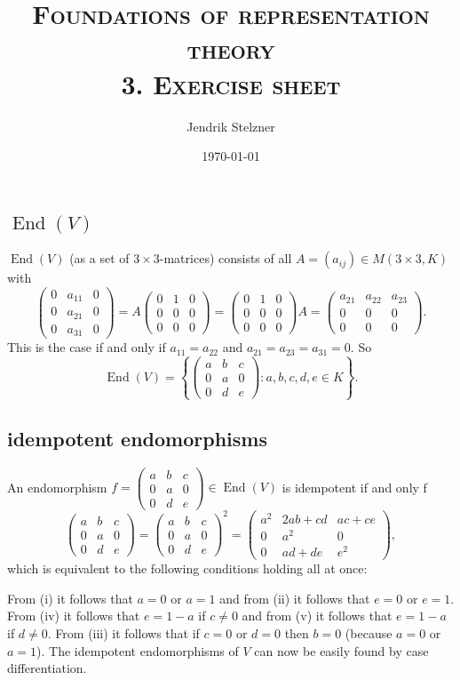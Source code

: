 \documentclass[a4paper,10pt]{article}
\title{\textsc{Foundations of representation theory \\ \Large 3. Exercise sheet}}
\author{Jendrik Stelzner}
\date{\today}
\newcommand{\End}{\operatorname{End}}
\newcommand{\vect}[1]{\begin{pmatrix}#1\end{pmatrix}}
\begin{document}
\maketitle





\section{}


\subsection*{$\End(V)$}
$\End(V)$ (as a set of $3 \times 3$-matrices) consists of all $A = (a_{ij}) \in M(3 \times 3, K)$ with
\[
 \vect{0&a_{11}&0\\0&a_{21}&0\\0&a_{31}&0}
 = A \vect{0&1&0\\0&0&0\\0&0&0}
 = \vect{0&1&0\\0&0&0\\0&0&0}A
 = \vect{a_{21}&a_{22}&a_{23}\\0&0&0\\0&0&0}.
\]
This is the case if and only if $a_{11}=a_{22}$ and $a_{21}=a_{23}=a_{31}=0$. So
\[
 \End(V) = \left\{ \vect{a&b&c\\0&a&0\\0&d&e} : a,b,c,d,e \in K\right\}.
\]


\subsection*{idempotent endomorphisms}
An endomorphism $f = \vect{a&b&c\\0&a&0\\0&d&e} \in \End(V)$ is idempotent if and only f
\[
 \vect{a&b&c\\0&a&0\\0&d&e} = \vect{a&b&c\\0&a&0\\0&d&e}^2 =
 \begin{pmatrix}
  a^2 & 2ab+cd & ac+ce \\
  0   & a^2    & 0 \\
  0   & ad+de & e^2
 \end{pmatrix},
\]
which is equivalent to the following conditions holding all at once:
From (i) it follows that $a = 0$ or $a = 1$ and from (ii) it follows that $e = 0$ or $e = 1$. From (iv) it follows that $e = 1-a$ if $c \neq 0$ and from (v) it follows that $e = 1-a$ if $d \neq 0$. From (iii) it follows that if $c = 0$ or $d = 0$ then $b = 0$ (because $a=0$ or $a=1$). The idempotent endomorphisms of $V$ can now be easily found by case differentiation.
\end{document}
